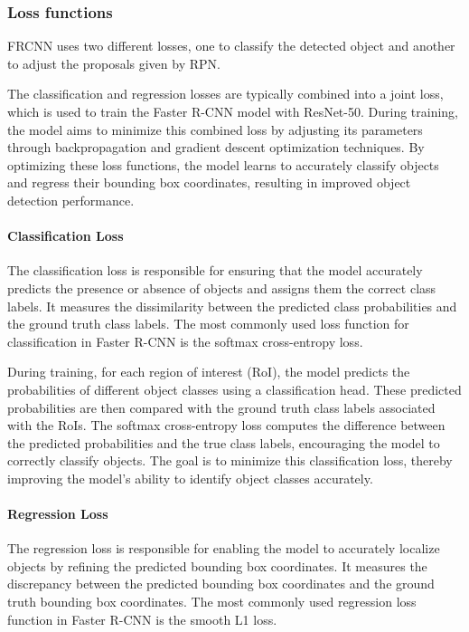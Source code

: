 \subsubsection{Loss functions}
FRCNN uses two different losses, one to classify the detected object and another to adjust the proposals given by RPN.

The classification and regression losses are typically combined into a joint loss, which is used to train the Faster R-CNN model with ResNet-50. During training, the model aims to minimize this combined loss by adjusting its parameters through backpropagation and gradient descent optimization techniques. By optimizing these loss functions, the model learns to accurately classify objects and regress their bounding box coordinates, resulting in improved object detection performance.
\paragraph{Classification Loss}
The classification loss is responsible for ensuring that the model accurately predicts the presence or absence of objects and assigns them the correct class labels. It measures the dissimilarity between the predicted class probabilities and the ground truth class labels. The most commonly used loss function for classification in Faster R-CNN is the softmax cross-entropy loss.

During training, for each region of interest (RoI), the model predicts the probabilities of different object classes using a classification head. These predicted probabilities are then compared with the ground truth class labels associated with the RoIs. The softmax cross-entropy loss computes the difference between the predicted probabilities and the true class labels, encouraging the model to correctly classify objects. The goal is to minimize this classification loss, thereby improving the model's ability to identify object classes accurately.
\paragraph{Regression Loss}

The regression loss is responsible for enabling the model to accurately localize objects by refining the predicted bounding box coordinates. It measures the discrepancy between the predicted bounding box coordinates and the ground truth bounding box coordinates. The most commonly used regression loss function in Faster R-CNN is the smooth L1 loss.

